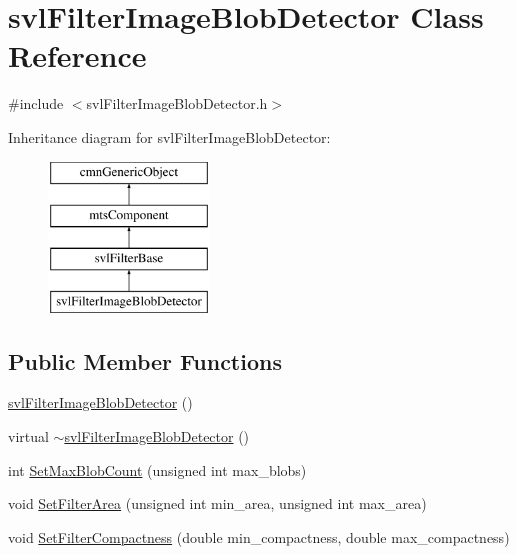 \hypertarget{classsvl_filter_image_blob_detector}{\section{svl\-Filter\-Image\-Blob\-Detector Class Reference}
\label{classsvl_filter_image_blob_detector}
}


{\ttfamily \#include $<$svl\-Filter\-Image\-Blob\-Detector.\-h$>$}

Inheritance diagram for svl\-Filter\-Image\-Blob\-Detector\-:\begin{figure}[H]
\begin{center}
\leavevmode
\includegraphics[height=4.000000cm]{da/d9a/classsvl_filter_image_blob_detector}
\end{center}
\end{figure}
\subsection*{Public Member Functions}
\begin{DoxyCompactItemize}
\item 
\hyperlink{classsvl_filter_image_blob_detector_a5285b6bd173bc28b6d7b7bfe209ae696}{svl\-Filter\-Image\-Blob\-Detector} ()
\item 
virtual \hyperlink{classsvl_filter_image_blob_detector_ade2f14158a8df2f5e5e7be890d4e3340}{$\sim$svl\-Filter\-Image\-Blob\-Detector} ()
\item 
int \hyperlink{classsvl_filter_image_blob_detector_a0d6186ee543acab3892c0f4a7e9837db}{Set\-Max\-Blob\-Count} (unsigned int max\-\_\-blobs)
\item 
void \hyperlink{classsvl_filter_image_blob_detector_ab73c492f8ffacc5aedd6af9428434dc2}{Set\-Filter\-Area} (unsigned int min\-\_\-area, unsigned int max\-\_\-area)
\item 
void \hyperlink{classsvl_filter_image_blob_detector_a496743d5dc86fd454a4d3205bda8d901}{Set\-Filter\-Compactness} (double min\-\_\-compactness, double max\-\_\-compactness)
\end{DoxyCompactItemize}
